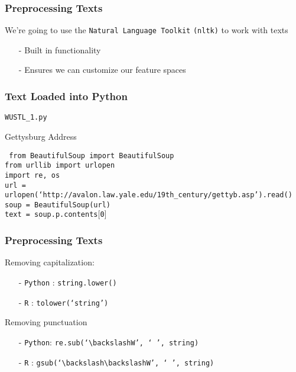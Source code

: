 \documentclass{beamer}
\numberwithin{equation}{section}
\begin{document}
\begin{frame}
\frametitle{Preprocessing Texts}

We're going to use the {\tt Natural Language Toolkit} {\tt (nltk)} to work with texts \\
\begin{itemize}
\item[-] Built in functionality
\item[-] Ensures we can customize our feature spaces
\end{itemize}

\end{frame}


\begin{frame}
\frametitle{Text Loaded into Python}


{\tt WUSTL\_1.py}

Gettysburg Address

\vspace{0.25in}
\begin{footnotesize}

{\tt
from BeautifulSoup import BeautifulSoup\\
from urllib import urlopen\\
import re, os\\

url  = urlopen(`http://avalon.law.yale.edu/19th\_century/gettyb.asp').read()\\


soup = BeautifulSoup(url)\\


text = soup.p.contents$[$0$]$\\

}

\end{footnotesize}

\end{frame}




\begin{frame}
\frametitle{Preprocessing Texts}

Removing capitalization:
\begin{itemize}
\item[-] {\tt Python} : \alert{{\tt string.lower()}}
\item[-] {\tt R} : \alert{{\tt tolower(`string')}}
\end{itemize}
Removing punctuation
\begin{itemize}
\item[-] {\tt Python}: \alert{{\tt re.sub(`$\backslash$W', ` ', string)}}
\item[-] {\tt R} : \alert{{\tt gsub(`$\backslash\backslash$W', ` ', string)}}
\end{itemize}


\end{frame}
\end{document}
